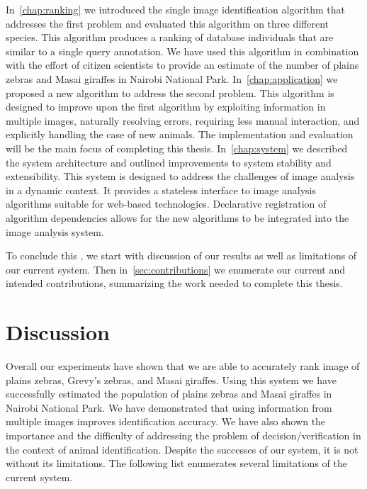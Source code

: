     In~\cref{chap:ranking} we introduced the single image identification
      algorithm that addresses the first problem and evaluated this algorithm on
      three different species.
    This algorithm produces a ranking of database individuals that are similar
      to a single query annotation.
    We have used this algorithm in combination with the effort of citizen
      scientists to provide an estimate of the number of plains zebras and Masai
      giraffes in Nairobi National Park.
    In~\cref{chap:application} we proposed a new algorithm to address the
      second problem.
    This algorithm is designed to improve upon the first algorithm by
      exploiting information in multiple images, naturally resolving errors,
      requiring less manual interaction, and explicitly handling the case of new
      animals.
    The implementation and evaluation will be the main focus of completing
      this thesis.
    In~\cref{chap:system} we described the system architecture and outlined
      improvements to system stability and extensibility.
    This system is designed to address the challenges of image analysis in a
      dynamic context.
    It provides a stateless interface to image analysis algorithms suitable
      for web-based technologies.
    Declarative registration of algorithm dependencies allows for the new
      algorithms to be integrated into the image analysis system.

    To conclude this \thesis{}, we start with discussion of our results as
      well as limitations of our current system.
    Then in~\cref{sec:contributions} we enumerate our current and intended
      contributions, summarizing the work needed to complete this thesis.

    \section{Discussion}\label{sec:discussresult} 

        Overall our experiments have shown that we are able to accurately rank
          image of plains zebras, Grevy's zebras, and Masai giraffes.
        Using this system we have successfully estimated the population of
          plains zebras and Masai giraffes in Nairobi National Park.
        We have demonstrated that using information from multiple images
          improves identification accuracy.
        We have also shown the importance and the difficulty of addressing the
          problem of decision/verification in the context of animal
          identification.
        Despite the successes of our system, it is not without its
          limitations.
        The following list enumerates several limitations of the current
          system.

